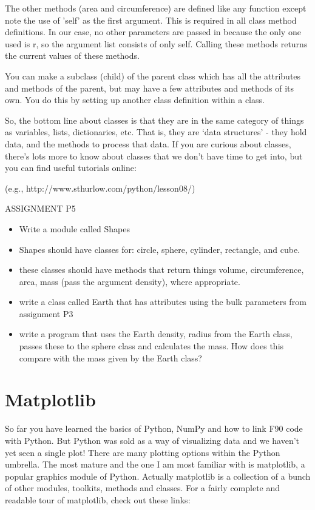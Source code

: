 {The other methods ({\color{blue}area} and {\color{blue}circumference}) are defined like any function except note the use of 'self' as the first argument.  This is required in all class method definitions.  In our case, no other parameters are passed in because the only one used is {\color{blue}r}, so the argument list consists of only {\color{blue}self}.  Calling these methods returns the current values of these methods.   

You can make a subclass (child) of the parent class which has all the attributes and methods of the parent, but may have a few attributes and methods of its own.   You do this by setting up another class definition within a class.  

So, the bottom line about classes is that they are  in the same category of things as variables, lists, dictionaries, etc. That is, they are  `data structures' - they hold data, and the methods to process that data.
If you are curious about classes, there's lots more to know about classes that we don't have time to get into, but you can find useful tutorials online:

 (e.g., http://www.sthurlow.com/python/lesson08/)
 
\noindent
{\singlespacing \color{red} ASSIGNMENT  P5
\begin{itemize}
\item Write a module called Shapes
\item Shapes should have classes for:  circle, sphere, cylinder, rectangle, and cube.
\item these classes should have methods that return things volume, circumference, area, mass (pass the argument density), where appropriate.  
\item write a class called Earth that has attributes using the bulk parameters from assignment P3
\item write a program that uses the Earth density, radius from the Earth class, passes these to the sphere class and calculates the mass.  How does this compare with the mass given by the Earth class?  
\end{itemize}
}



\section{Matplotlib}

So far you have learned the basics of Python, NumPy and how to link F90 code with Python.  But Python was sold as a way of visualizing data and we haven't yet seen a single plot!  There are many plotting options within the Python umbrella. The most mature and the one I am most familiar with is {\color{blue}matplotlib}, a popular  graphics module of Python.  
Actually  {\color{blue}matplotlib} is a collection of a bunch of other modules, toolkits, methods and  classes.   For a fairly complete and readable tour of matplotlib, check out these links:  
 
}
